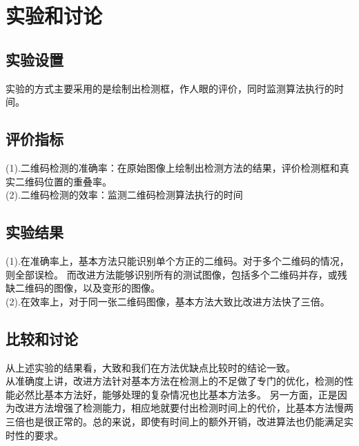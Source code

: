 \section{实验和讨论}
\subsection{实验设置}
实验的方式主要采用的是绘制出检测框，作人眼的评价，同时监测算法执行的时间。
\subsection{评价指标}
(1).二维码检测的准确率：在原始图像上绘制出检测方法的结果，评价检测框和真实二维码位置的重叠率。\\
(2).二维码检测的效率：监测二维码检测算法执行的时间
\subsection{实验结果}
(1).在准确率上，基本方法只能识别单个方正的二维码。对于多个二维码的情况，则全部误检。
而改进方法能够识别所有的测试图像，包括多个二维码并存，或残缺二维码的图像，以及变形的图像。\\
(2).在效率上，对于同一张二维码图像，基本方法大致比改进方法快了三倍。
\subsection{比较和讨论}
从上述实验的结果看，大致和我们在方法优缺点比较时的结论一致。\\
从准确度上讲，改进方法针对基本方法在检测上的不足做了专门的优化，检测的性能必然比基本方法好，能够处理的复杂情况也比基本方法多。
另一方面，正是因为改进方法增强了检测能力，相应地就要付出检测时间上的代价，比基本方法慢两三倍也是很正常的。总的来说，即使有时间上的额外开销，改进算法也仍能满足实时性的要求。